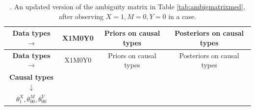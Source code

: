 \documentclass[
  12pt,
]{book}
\begin{document}
\begin{longtable}[]{@{}cccc@{}}
\caption{\label{tab:ambigmedupdate}. An updated version of the ambiguity matrix in Table \ref{tab:ambigmatrixmed}, after observing \(X=1, M=0, Y=0\) in a case.}\tabularnewline
\toprule
\begin{minipage}[b]{0.36\columnwidth}\centering
\textbf{Data types} \(\rightarrow\)\strut
\end{minipage} & \begin{minipage}[b]{0.07\columnwidth}\centering
X1M0Y0\strut
\end{minipage} & \begin{minipage}[b]{0.21\columnwidth}\centering
Priors on causal types\strut
\end{minipage} & \begin{minipage}[b]{0.25\columnwidth}\centering
Posteriors on causal types\strut
\end{minipage}\tabularnewline
\midrule
\endfirsthead
\toprule
\begin{minipage}[b]{0.36\columnwidth}\centering
\textbf{Data types} \(\rightarrow\)\strut
\end{minipage} & \begin{minipage}[b]{0.07\columnwidth}\centering
X1M0Y0\strut
\end{minipage} & \begin{minipage}[b]{0.21\columnwidth}\centering
Priors on causal types\strut
\end{minipage} & \begin{minipage}[b]{0.25\columnwidth}\centering
Posteriors on causal types\strut
\end{minipage}\tabularnewline
\midrule
\endhead
\begin{minipage}[t]{0.36\columnwidth}\centering
\textbf{Causal types} \(\downarrow\)\strut
\end{minipage} & \begin{minipage}[t]{0.07\columnwidth}\centering
\strut
\end{minipage} & \begin{minipage}[t]{0.21\columnwidth}\centering
\strut
\end{minipage} & \begin{minipage}[t]{0.25\columnwidth}\centering
\strut
\end{minipage}\tabularnewline
\begin{minipage}[t]{0.36\columnwidth}\centering
\(\theta^X_1,\theta^M_{00},\theta^Y_{00}\)\strut
\end{minipage} & \begin{minipage}[t]{0.07\columnwidth}\centering

\end{minipage}
\end{longtable}
\end{document}
